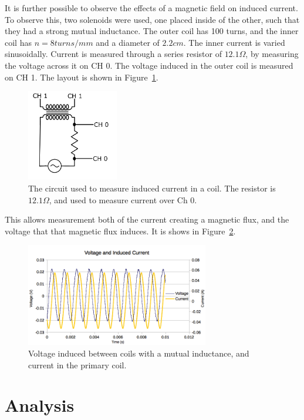 \documentclass[journal]{IEEEtran}
\begin{document}
It is further possible to observe the effects of a magnetic field on induced
current. To observe this, two solenoids were used, one placed inside of the
other, such that they had a strong mutual inductance. The outer coil has 100
turns, and the inner coil has $n=8 turns/mm$ and a diameter of $2.2 cm$. The
inner current is varied sinusoidally. Current is measured through a series
resistor of $12.1 \Omega$, by measuring the voltage across it on CH 0. The
voltage induced in the outer coil is measured on CH 1. The layout is shown in
Figure~\ref{fig:ac_circuit}.

\begin{figure}[ht!]
\centering
\includegraphics[width=40mm]{circuit.png}
\caption{The circuit used to measure induced current in a coil. The resistor is
$12.1 \Omega$, and used to measure current over Ch 0.}
\label{fig:ac_circuit}
\end{figure}

This allows measurement both of the current creating a magnetic flux, and the
voltage that that magnetic flux induces. It is shows in
Figure~\ref{fig:ac_induced}.

\begin{figure}[ht!]
\centering
\includegraphics[width=80mm]{ac_induced.png}
\caption{Voltage induced between coils with a mutual inductance, and current in
the primary coil.}
\label{fig:ac_induced}
\end{figure}

\section{Analysis}
\end{document}
